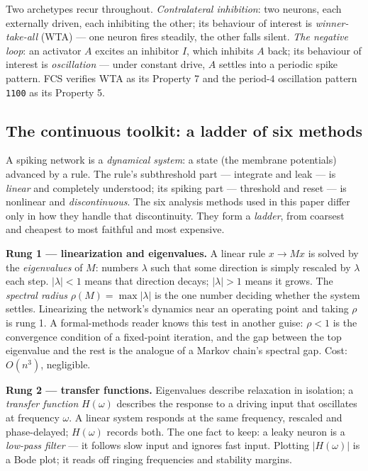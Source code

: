 \documentclass[conference]{IEEEtran}
\begin{document}
Two archetypes recur throughout. \emph{Contralateral inhibition}: two neurons,
each externally driven, each inhibiting the other; its behaviour of interest is
\emph{winner-take-all} (WTA) --- one neuron fires steadily, the other falls
silent. \emph{The negative loop}: an activator $A$ excites an inhibitor $I$,
which inhibits $A$ back; its behaviour of interest is \emph{oscillation} ---
under constant drive, $A$ settles into a periodic spike pattern. FCS verifies
WTA as its Property 7 and the period-$4$ oscillation pattern \texttt{1100} as
its Property 5.

\subsection{The continuous toolkit: a ladder of six methods}\label{sec:toolkit}

A spiking network is a \emph{dynamical system}: a state (the membrane
potentials) advanced by a rule. The rule's subthreshold part --- integrate and
leak --- is \emph{linear} and completely understood; its spiking part ---
threshold and reset --- is nonlinear and \emph{discontinuous}. The six analysis
methods used in this paper differ only in how they handle that discontinuity.
They form a \emph{ladder}, from coarsest and cheapest to most faithful and most
expensive.

\textbf{Rung 1 --- linearization and eigenvalues.} A linear rule $x \to M x$ is
solved by the \emph{eigenvalues} of $M$: numbers $\lambda$ such that some
direction is simply rescaled by $\lambda$ each step. $|\lambda| < 1$ means that
direction decays; $|\lambda| > 1$ means it grows. The \emph{spectral radius}
$\rho(M) = \max|\lambda|$ is the one number deciding whether the system
settles. Linearizing the network's dynamics near an operating point and taking
$\rho$ is rung 1. A formal-methods reader knows this test in another guise:
$\rho < 1$ is the convergence condition of a fixed-point iteration, and the gap
between the top eigenvalue and the rest is the analogue of a Markov chain's
spectral gap. Cost: $O(n^3)$, negligible.

\textbf{Rung 2 --- transfer functions.} Eigenvalues describe relaxation in
isolation; a \emph{transfer function} $H(\omega)$ describes the response to a
driving input that oscillates at frequency $\omega$. A linear system responds
at the same frequency, rescaled and phase-delayed; $H(\omega)$ records both.
The one fact to keep: a leaky neuron is a \emph{low-pass filter} --- it follows
slow input and ignores fast input. Plotting $|H(\omega)|$ is a Bode plot; it
reads off ringing frequencies and stability margins.
\end{document}
